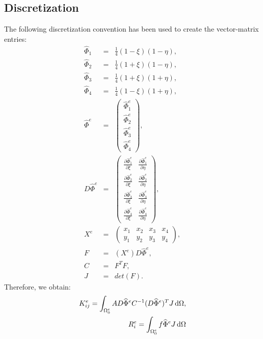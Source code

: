 \documentclass[a4paper,12pt]{article}
\newcommand{\intd}{\,{\rm d}}
\begin{document}
\subsection{Discretization}
The following discretization convention has been used to create the vector-matrix entries:
\begin{eqnarray}
\widehat{\Phi}_1 &=& \frac{1}{4}(1 -\xi)(1 - \eta),\\
\widehat{\Phi}_2 &=& \frac{1}{4}(1 + \xi)(1 - \eta),\\
\widehat{\Phi}_3 &=& \frac{1}{4}(1 + \xi)(1 + \eta),\\
\widehat{\Phi}_4 &=& \frac{1}{4}(1 - \xi)(1  + \eta),\\
\widehat{\Phi}^e &=& \left( \begin{array}{cc}
\widehat{\Phi}^e_1 \\
\widehat{\Phi}^e_2 \\
\widehat{\Phi}^e_3 \\
\widehat{\Phi}^e_4
\end{array} \right),\\
D \widehat{\Phi}^e &=& \left( \begin{array}{cc}
\frac{\partial \widehat{\Phi}^e_1}{\partial \xi}& \frac{\partial \widehat{\Phi}^e_1}{\partial \eta} \\
\frac{\partial \widehat{\Phi}^e_2}{\partial \xi}& \frac{\partial \widehat{\Phi}^e_2}{\partial \eta} \\
\frac{\partial \widehat{\Phi}^e_3}{\partial \xi}& \frac{\partial \widehat{\Phi}^e_3}{\partial \eta} \\
\frac{\partial \widehat{\Phi}^e_4}{\partial \xi}& \frac{\partial \widehat{\Phi}^e_4}{\partial \eta}
\end{array} \right),\\
X^e &=& \left( \begin{array}{cccc}
x_1& x_2 & x_3 & x_4 \\
y_1& y_2 & y_3 & y_4 
\end{array} \right),\\
F &=& (X^e)D\widehat{\Phi}^e,\\
C &=& F^TF,\\
J &=& det(F).
\end{eqnarray}
Therefore, we obtain:
\begin{eqnarray}
K_{ij}^e = \int_{\Omega^e_0}AD\widehat{\Phi}^eC^{-1}(D\widehat{\Phi}^{e})^TJ\intd \Omega,\\
R_i^e = \int_{\Omega^e_0}f\widehat{\Phi}^eJ\intd \Omega 
\end{eqnarray}
\end{document}

